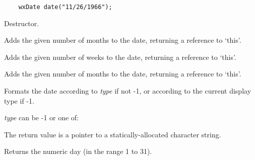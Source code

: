 \begin{verbatim}
    wxDate date("11/26/1966");
\end{verbatim}



Destructor.




Adds the given number of months to the date, returning a reference to `this'.



Adds the given number of weeks to the date, returning a reference to `this'.



Adds the given number of months to the date, returning a reference to `this'.


 

Formats the date according to {\it type} if not -1, or according
to the current display type if -1.

{\it type} can be -1 or one of:

\begin{twocollist}\itemsep=0pt
\end{twocollist}

The return value is a pointer to a statically-allocated character string.


 

Returns the numeric day (in the range 1 to 31).


 

